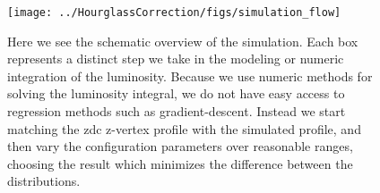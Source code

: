 \begin{figure}
\begin{center}
\texttt{[image: ../HourglassCorrection/figs/simulation\_flow]}
\caption{
Here we see the schematic overview of the simulation. Each box represents a
distinct step we take in the modeling or numeric integration of the luminosity.
Because we use numeric methods for solving the luminosity integral, we do not
have easy access to regression methods such as gradient-descent. Instead we
start matching the zdc z-vertex profile with the simulated profile, and then
vary the configuration parameters over reasonable ranges, choosing the result
which minimizes the difference between the distributions.
}
\label{fig:simulation_flow}
\end{center}
\end{figure}
